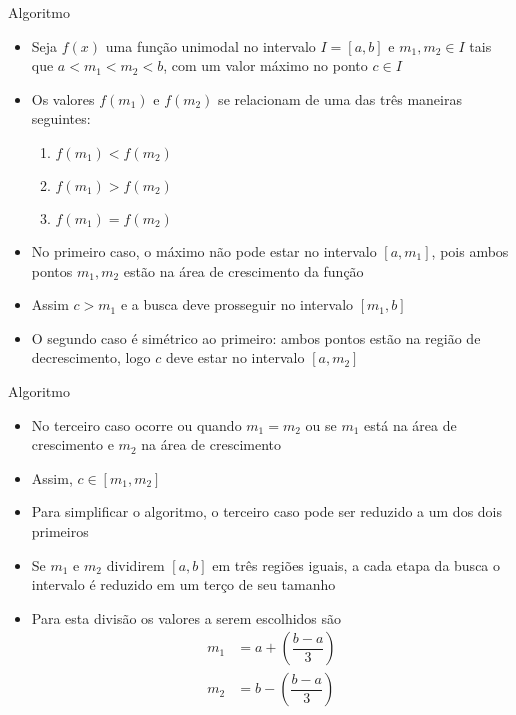 \begin{frame}[fragile]{Algoritmo}

    \begin{itemize}
        \item Seja $f(x)$ uma função unimodal no intervalo $I = [a, b]$ e $m_1, m_2\in I$ tais
            que $a < m_1 < m_2 < b$, com um valor máximo no ponto $c\in I$

        \item Os valores $f(m_1)$ e $f(m_2)$ se relacionam de uma das três maneiras seguintes:
        \begin{enumerate}
            \item $f(m_1) < f(m_2)$
            \item $f(m_1) > f(m_2)$
            \item $f(m_1) = f(m_2)$
        \end{enumerate}

        \item No primeiro caso, o máximo não pode estar no intervalo $[a, m_1]$, pois ambos
            pontos $m_1, m_2$ estão na área de crescimento da função

        \item Assim $c > m_1$ e a busca deve prosseguir no intervalo $[m_1, b]$

        \item O segundo caso é simétrico ao primeiro: ambos pontos estão na região de decrescimento,
            logo $c$ deve estar no intervalo $[a, m_2]$
    \end{itemize}

\end{frame}

\begin{frame}[fragile]{Algoritmo}

    \begin{itemize}
        \item No terceiro caso ocorre ou quando $m_1 = m_2$ ou se $m_1$ está na área de crescimento
            e $m_2$ na área de crescimento

        \item Assim, $c\in [m_1, m_2]$

        \item Para simplificar o algoritmo, o terceiro caso pode ser reduzido a um dos dois
            primeiros

        \item Se $m_1$ e $m_2$ dividirem $[a, b]$ em três regiões iguais, a cada etapa da busca
            o intervalo é reduzido em um terço de seu tamanho

        \item Para esta divisão os valores a serem escolhidos são
        \begin{align*}
            m_1 &= a + \left(\dfrac{b - a}{3}\right) \\
            m_2 &= b - \left(\dfrac{b - a}{3}\right)
        \end{align*}
    \end{itemize}

\end{frame}

